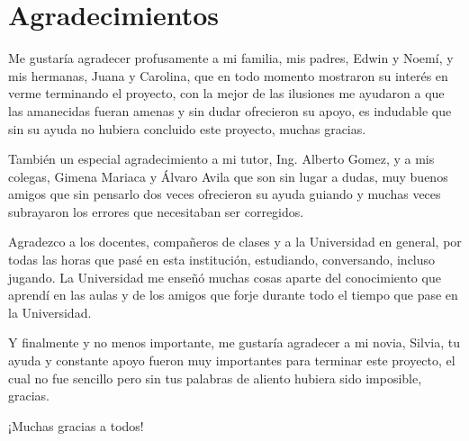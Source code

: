\chapter*{Agradecimientos} %


%

Me gustaría agradecer profusamente a mi familia, mis padres, Edwin y Noemí, y mis hermanas, Juana y Carolina, que en todo momento mostraron su interés en verme terminando el proyecto, con la mejor de las ilusiones me ayudaron a que las amanecidas fueran amenas y sin dudar ofrecieron su apoyo, es indudable que sin su ayuda no hubiera concluido este proyecto, muchas gracias.

También un especial agradecimiento a mi tutor, Ing. Alberto Gomez, y a mis colegas, Gimena Mariaca y Álvaro Avila que son sin lugar a dudas, muy buenos amigos que sin pensarlo dos veces ofrecieron su ayuda guiando y muchas veces subrayaron los errores que necesitaban ser corregidos.

Agradezco a los docentes, compañeros de clases y a la Universidad en general, por todas las horas que pasé en esta institución, estudiando, conversando, incluso jugando. La Universidad me enseñó muchas cosas aparte del conocimiento que aprendí en las aulas y de los amigos que forje durante todo el tiempo que pase en la Universidad.

Y finalmente y no menos importante, me gustaría agradecer a mi novia, Silvia, tu ayuda y constante apoyo fueron muy importantes para terminar este proyecto, el cual no fue sencillo pero sin tus palabras de aliento hubiera sido imposible, gracias.


¡Muchas gracias a todos!
